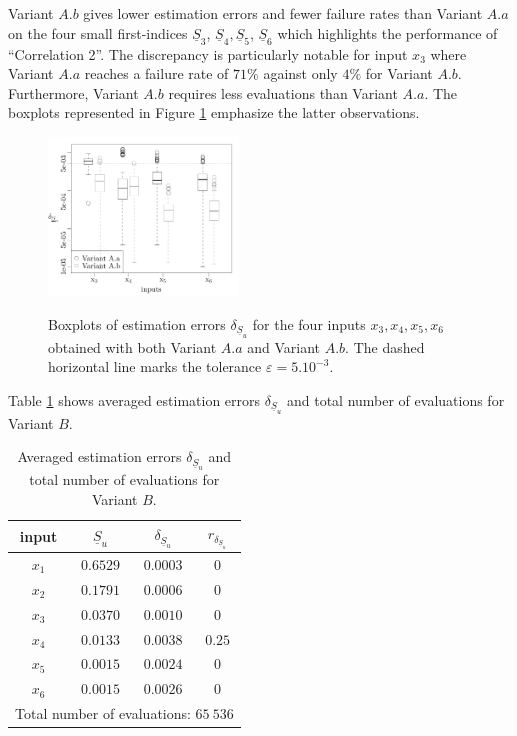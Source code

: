 Variant $A.b$ gives lower estimation errors and fewer failure rates than Variant $A.a$ on the four small first-indices $\underline{S}_3$, $\underline{S}_4,\underline{S}_5$, $\underline{S}_6$ which highlights the performance of ``Correlation 2''. The discrepancy is particularly notable for input $x_3$ where Variant $A.a$ reaches a failure rate of $71\%$ against only $4\%$ for Variant $A.b$. Furthermore, Variant $A.b$ requires less evaluations than Variant $A.a$. The boxplots represented in Figure \ref{boxplots.bratley} emphasize the latter observations.
\begin{figure}[!ht]
\caption{Boxplots of estimation errors $\delta_{\underline{S}_u}$ for the four inputs $x_3,x_4,x_5,x_6$ obtained with both Variant $A.a$ and Variant $A.b$. The dashed horizontal line marks the tolerance $\varepsilon=5.10^{-3}$.}
\centering
\includegraphics[width=0.45\textwidth]{Fig3.pdf}
\label{boxplots.bratley}
\end{figure}

Table \ref{res.bratley.B} shows averaged estimation errors $\delta_{\underline{S}_u}$ and total number of evaluations for Variant $B$. 
\begin{table}[!ht]
\caption{Averaged estimation errors $\delta_{\underline{S}_u}$ and total number of evaluations for Variant $B$.}
\centering
\begin{tabular}{cccc}
\hline
 input & $\underline{S}_u$ & $\delta_{\underline{S}_u}$ & $r_{\delta_{\underline{S}_u}}$ \\ \hline
 $x_1$ & $0.6529$ &  $0.0003$ & $0$ \\ \hline
 $x_2$ & $0.1791$ &  $0.0006$ & $0$ \\ \hline
 $x_3$ & $0.0370$ &  $0.0010$ & $0$ \\ \hline
 $x_4$ & $0.0133$ &  $0.0038$ & $0.25$    \\ \hline
 $x_5$ & $0.0015$ & $0.0024$ & $0$  \\ \hline
 $x_6$ & $0.0015$ & $0.0026$ & $0$  \\ \hline \hline
\multicolumn{4}{l}{Total number of evaluations: $65 \ 536$}\\ \hline 
\end{tabular}
\label{res.bratley.B}
\end{table}

